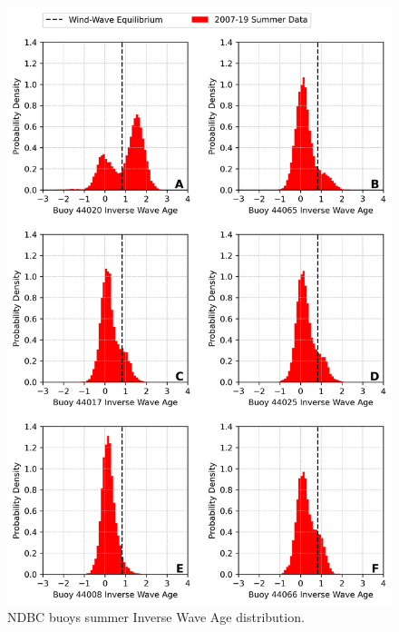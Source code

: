 \begin{figure}[H]
\centering
\includegraphics[width=0.95\linewidth]{Figures/Chapter5/inv_wave_age_pdfs_summer.png}
\caption{NDBC buoys summer Inverse Wave Age distribution.}
\label{fig:inv_wave_age_buoys_summer}
\end{figure}


